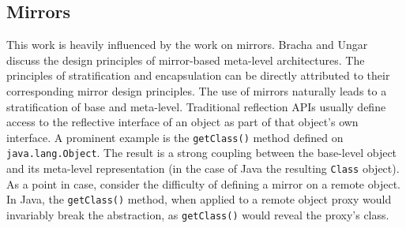 \documentclass{sig-alternate}
\newcommand{\noSuchMethod}{\texttt{\_\_noSuchMethod\_\_}}
\begin{document}



\subsection{Mirrors}
\label{sub:mirrors}

This work is heavily influenced by the work on mirrors. Bracha and Ungar~\cite{bracha04mirrors} discuss the design principles of mirror-based meta-level architectures. The principles of stratification and encapsulation can be directly attributed to their corresponding mirror design principles. The use of mirrors naturally leads to a stratification of base and meta-level. Traditional reflection APIs usually define access to the reflective interface of an object as part of that object's own interface. A prominent example is the \texttt{getClass()} method defined on \texttt{java.lang.Object}. The result is a strong coupling between the base-level object and its meta-level representation (in the case of Java the resulting \texttt{Class} object). As a point in case, consider the difficulty of defining a mirror on a remote object. In Java, the \texttt{getClass()} method, when applied to a remote object proxy would invariably break the abstraction, as \texttt{getClass()} would reveal the proxy's class.
\end{document}
